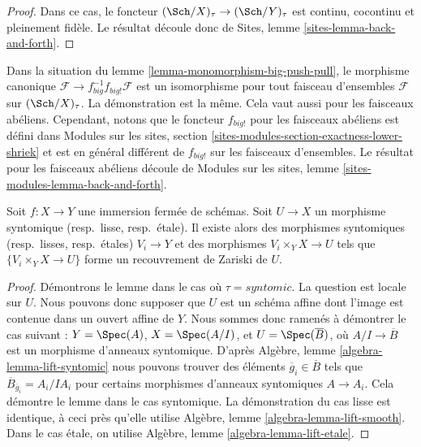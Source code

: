 \begin{proof}
Dans ce cas, le foncteur $(\Sch/X)_\tau \to (\Sch/Y)_\tau$
est continu, cocontinu et pleinement fid\`ele. Le r\'esultat d\'ecoule donc de
Sites, lemme \ref{sites-lemma-back-and-forth}.
\end{proof}

\begin{remark}
\label{remark-push-pull-shriek}
Dans la situation du
lemme \ref{lemma-monomorphism-big-push-pull},
le morphisme canonique
$\mathcal{F} \to f_{big}^{-1}f_{big!}\mathcal{F}$
est un isomorphisme pour tout faisceau d'ensembles $\mathcal{F}$ sur
$(\Sch/X)_\tau$. La d\'emonstration est la m\^eme. Cela
vaut aussi pour les faisceaux ab\'eliens. Cependant, notons
que le foncteur $f_{big!}$ pour les faisceaux ab\'eliens est d\'efini dans
Modules sur les sites, section \ref{sites-modules-section-exactness-lower-shriek}
et est en g\'en\'eral diff\'erent de $f_{big!}$ sur les faisceaux d'ensembles.
Le r\'esultat pour les faisceaux ab\'eliens d\'ecoule de
Modules sur les sites, lemme \ref{sites-modules-lemma-back-and-forth}.
\end{remark}

\begin{lemma}
\label{lemma-closed-immersion-cover-from-below}
Soit $f : X \to Y$ une immersion ferm\'ee de sch\'emas.
Soit $U \to X$ un morphisme syntomique (resp.\ lisse, resp.\ \'etale).
Il existe alors des morphismes syntomiques (resp.\ lisses, resp.\ \'etales)
$V_i \to Y$ et des morphismes $V_i \times_Y X \to U$ tels que
$\{V_i \times_Y X \to U\}$ forme un recouvrement de Zariski de $U$.
\end{lemma}

\begin{proof}
D\'emontrons le lemme dans le cas o\`u $\tau = syntomic$.
La question est locale sur $U$. Nous pouvons donc supposer que $U$ est
un sch\'ema affine dont l'image est contenue dans un ouvert affine de $Y$.
Nous sommes donc ramen\'es \`a d\'emontrer le cas suivant :
$Y = \Spec(A)$, $X = \Spec(A/I)$, et
$U = \Spec(\overline{B})$, o\`u
$A/I \to \overline{B}$ est un morphisme d'anneaux syntomique.
D'apr\`es Algèbre, lemme \ref{algebra-lemma-lift-syntomic}
nous pouvons trouver des \'el\'ements $\overline{g}_i \in \overline{B}$
tels que
$\overline{B}_{\overline{g}_i} = A_i/IA_i$ pour certains morphismes d'anneaux syntomiques
$A \to A_i$.
Cela d\'emontre le lemme dans le cas syntomique.
La d\'emonstration du cas lisse est identique, \`a ceci pr\`es qu'elle utilise
Algèbre, lemme \ref{algebra-lemma-lift-smooth}.
Dans le cas \'etale, on utilise
Algèbre, lemme \ref{algebra-lemma-lift-etale}.
\end{proof}

